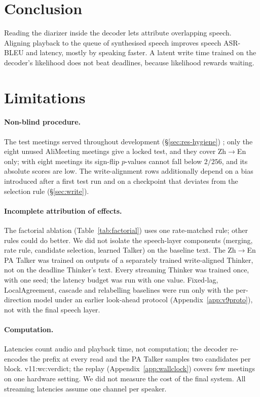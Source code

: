 \section{Conclusion}
\label{sec:conclusion}

Reading the diarizer inside the decoder lets \sys{} attribute overlapping speech. Aligning playback to the queue of
synthesised speech improves speech ASR-BLEU and latency, mostly by speaking faster. A latent write time trained on
the decoder's likelihood does not beat deadlines, because likelihood rewards waiting.

\section*{Limitations}

\paragraph{Non-blind procedure.} The test meetings served throughout development (\S\ref{sec:res-hygiene})%
\ifAliEval{}; only the eight unused AliMeeting meetings give a locked test, and they cover Zh$\rightarrow$En only;
with eight meetings its sign-flip $p$-values cannot fall below $2/256$, and its absolute scores are low\fi.
The write-alignment rows additionally depend on a bias introduced after a first test run and on a checkpoint that
deviates from the selection rule (\S\ref{sec:write}).

\paragraph{Incomplete attribution of effects.}\ifFactorial{} The factorial ablation (Table~\ref{tab:factorial}) uses
one rate-matched rule; other rules could do better.\else{} We did not isolate the speech-layer components (merging, rate
rule, candidate selection, learned Talker) on the baseline text.\fi{} The Zh$\rightarrow$En PA Talker was trained on
outputs of a separately trained write-aligned Thinker, not on the deadline Thinker's text. Every streaming Thinker was
trained once, with one seed; the latency budget was run with one value. Fixed-lag, LocalAgreement, cascade and
relabelling baselines were run only with the per-direction model under an earlier look-ahead protocol
(Appendix~\ref{app:v9proto}), not with the final speech layer.

\paragraph{Computation.} Latencies count audio and playback time, not computation; the decoder re-encodes the prefix
at every read and the PA Talker samples two candidates per block.\ifWallclock{} \num{v11:wc:verdict}; the replay
(Appendix~\ref{app:wallclock}) covers few meetings on one hardware setting.\else{} We did not measure the cost of the
final system.\fi{} All streaming latencies assume one channel per speaker.

